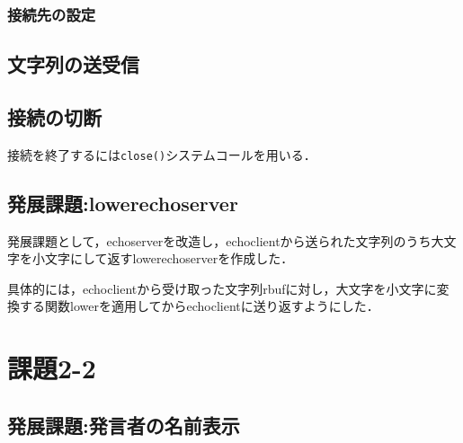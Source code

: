 \documentclass[a4j,10pt,titlepage]{jsarticle}
\begin{document}
\subsubsection{接続先の設定}


\subsection{文字列の送受信}


\subsection{接続の切断}
接続を終了するには\verb|close()|システムコールを用いる．

\subsection{発展課題:lowerechoserver}
発展課題として，echoserverを改造し，echoclientから送られた文字列のうち大文字を小文字にして返すlowerechoserverを作成した．

具体的には，echoclientから受け取った文字列rbufに対し，大文字を小文字に変換する関数lowerを適用してからechoclientに送り返すようにした．

\section{課題2-2}
\subsection{発展課題:発言者の名前表示}
\end{document}
